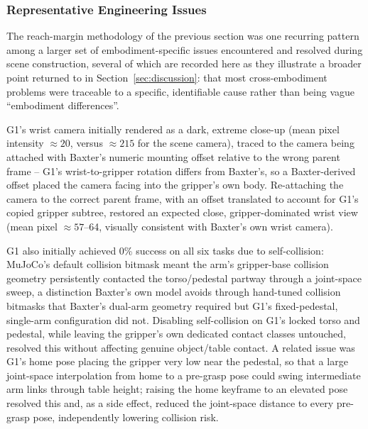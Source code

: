 \documentclass[12pt]{article}
\begin{document}
\subsubsection{Representative Engineering Issues}
\label{sec:crossemb-bugs}

The reach-margin methodology of the previous section was one recurring pattern among a larger set of embodiment-specific issues encountered and resolved during scene construction, several of which are recorded here as they illustrate a broader point returned to in Section~\ref{sec:discussion}: that most cross-embodiment problems were traceable to a specific, identifiable cause rather than being vague ``embodiment differences''.

G1's wrist camera initially rendered as a dark, extreme close-up (mean pixel intensity $\approx 20$, versus $\approx 215$ for the scene camera), traced to the camera being attached with Baxter's numeric mounting offset relative to the wrong parent frame -- G1's wrist-to-gripper rotation differs from Baxter's, so a Baxter-derived offset placed the camera facing into the gripper's own body. Re-attaching the camera to the correct parent frame, with an offset translated to account for G1's copied gripper subtree, restored an expected close, gripper-dominated wrist view (mean pixel $\approx 57$--64, visually consistent with Baxter's own wrist camera).

G1 also initially achieved 0\% success on all six tasks due to self-collision: MuJoCo's default collision bitmask meant the arm's gripper-base collision geometry persistently contacted the torso/pedestal partway through a joint-space sweep, a distinction Baxter's own model avoids through hand-tuned collision bitmasks that Baxter's dual-arm geometry required but G1's fixed-pedestal, single-arm configuration did not. Disabling self-collision on G1's locked torso and pedestal, while leaving the gripper's own dedicated contact classes untouched, resolved this without affecting genuine object/table contact. A related issue was G1's home pose placing the gripper very low near the pedestal, so that a large joint-space interpolation from home to a pre-grasp pose could swing intermediate arm links through table height; raising the home keyframe to an elevated pose resolved this and, as a side effect, reduced the joint-space distance to every pre-grasp pose, independently lowering collision risk.
\end{document}
